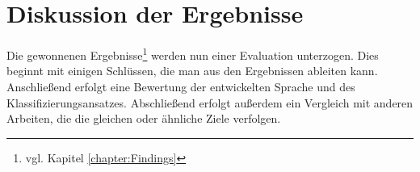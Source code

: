 \chapter{Diskussion der Ergebnisse}
    \label{chapter:FindingsDiscussion}
    Die gewonnenen Ergebnisse\footnote{vgl. Kapitel \ref{chapter:Findings}}
    werden nun einer Evaluation unterzogen.
    Dies beginnt mit einigen Schlüssen,
    die man aus den Ergebnissen ableiten kann.
    Anschließend erfolgt eine Bewertung der entwickelten Sprache
    und des Klassifizierungsansatzes.
    Abschließend erfolgt außerdem ein Vergleich mit anderen Arbeiten,
    die die gleichen oder ähnliche Ziele verfolgen.

    
    
    
